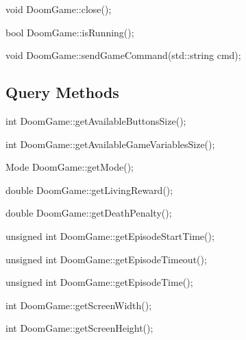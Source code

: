 \documentclass[english,bachelor,a4paper,twoside]{ppfcmthesis}
\begin{document}
\begin{clinee}
	void DoomGame::close();
\end{clinee}


\begin{clinee}
	bool DoomGame::isRunning();
\end{clinee}


\begin{clinee}
	void DoomGame::sendGameCommand(std::string cmd);
\end{clinee}


\subsection{Query Methods}


\begin{clinee}
int DoomGame::getAvailableButtonsSize();
\end{clinee}

\begin{clinee}
int DoomGame::getAvailableGameVariablesSize();
\end{clinee}

\begin{clinee}
Mode DoomGame::getMode();
\end{clinee}

\begin{clinee}
double DoomGame::getLivingReward();
\end{clinee}

\begin{clinee}
double DoomGame::getDeathPenalty();
\end{clinee}

\begin{clinee}
unsigned int DoomGame::getEpisodeStartTime();
\end{clinee}

\begin{clinee}
unsigned int DoomGame::getEpisodeTimeout();
\end{clinee}

\begin{clinee}
unsigned int DoomGame::getEpisodeTime();
\end{clinee}

\begin{clinee}
int DoomGame::getScreenWidth();
\end{clinee}

\begin{clinee}
int DoomGame::getScreenHeight();
\end{clinee}
\end{document}
